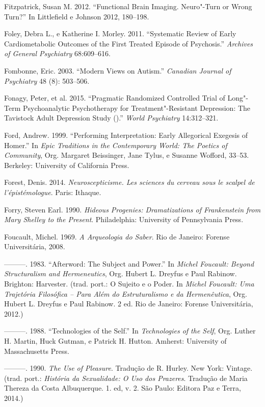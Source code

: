 Fitzpatrick, Susan M. 2012. ``Functional Brain Imaging. Neuro"-Turn or
Wrong Turn?'' In Littlefield e Johnson 2012, 180--198.

Foley, Debra L., e Katherine I. Morley. 2011. ``Systematic Review of
Early Cardiometabolic Outcomes of the First Treated Episode of
Psychosis.'' \emph{Archives of General Psychiatry} 68:609--616.

Fombonne, Eric. 2003. ``Modern Views on Autism.'' \emph{Canadian Journal
of Psychiatry} 48 (8): 503--506.

Fonagy, Peter, et al. 2015. ``Pragmatic Randomized Controlled Trial of
Long"-Term Psychoanalytic Psychotherapy for Treatment"-Resistant
Depression: The Tavistock Adult Depression Study ().'' \emph{World
Psychiatry} 14:312--321.

Ford, Andrew. 1999. ``Performing Interpretation: Early Allegorical
Exegesis of Homer.'' In \emph{Epic Traditions in the Contemporary World:
The Poetics of Community}, Org. Margaret Beissinger, Jane Tylus, e
Susanne Wofford, 33--53. Berkeley: University of California Press.

Forest, Denis. 2014. \emph{Neuroscepticisme. Les sciences du cerveau
sous le scalpel de l'épistémologue}. Paris: Ithaque.

Forry, Steven Earl. 1990. \emph{Hideous Progenies: Dramatizations of
Frankenstein from Mary Shelley to the Present}. Philadelphia: University
of Pennsylvania Press.

Foucault, Michel. 1969. \emph{A Arqueologia do Saber}. Rio de Janeiro:
Forense Universitária, 2008.

---------. 1983. ``Afterword: The Subject and Power.'' In \emph{Michel
Foucault: Beyond Structuralism and Hermeneutics}, Org. Hubert L. Dreyfus
e Paul Rabinow. Brighton: Harvester. (trad. port.: O Sujeito e o Poder.
In \emph{Michel Foucault: Uma Trajetória Filosófica -- Para Além do
Estruturalismo e da Hermenêutica}, Org. Hubert L. Dreyfus e Paul
Rabinow. 2 ed. Rio de Janeiro: Forense Universitária, 2012.)

---------. 1988. ``Technologies of the Self.'' In \emph{Technologies of
the Self}, Org. Luther H. Martin, Huck Gutman, e Patrick H. Hutton.
Amherst: University of Massachusetts Press.

---------. 1990. \emph{The Use of Pleasure}. Tradução de R. Hurley. New
York: Vintage. (trad. port.: \emph{História da Sexualidade: O Uso dos
Prazeres}. Tradução de Maria Thereza da Costa Albuquerque. 1. ed, v. 2.
São Paulo: Editora Paz e Terra, 2014.)

